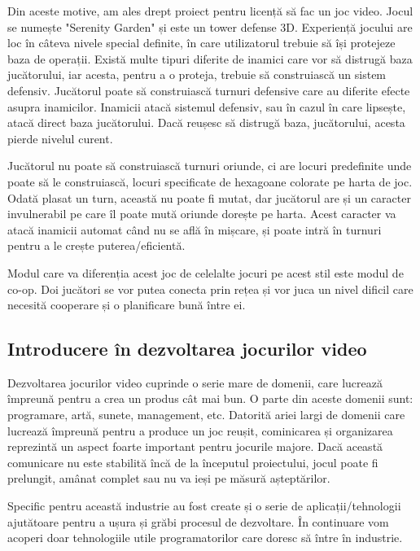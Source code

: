 \documentclass[12pt, a4paper]{article}
\begin{document}
	Din aceste motive, am ales drept proiect pentru licență să fac un joc video. Jocul se numește "Serenity Garden" și este un tower defense 3D. Experiență jocului are loc în câteva nivele special definite, în care utilizatorul trebuie să își protejeze baza de operații. Există multe tipuri diferite de inamici care vor să distrugă baza jucătorului, iar acesta, pentru a o proteja, trebuie să construiască un sistem defensiv. Jucătorul poate să construiască turnuri defensive care au diferite efecte asupra inamicilor. Inamicii atacă sistemul defensiv, sau în cazul în care lipsește, atacă direct baza jucătorului. Dacă reușesc să distrugă baza, jucătorului, acesta pierde nivelul curent.
	\newline
	
	Jucătorul nu poate să construiască turnuri oriunde, ci are locuri predefinite unde poate să le construiască, locuri specificate de hexagoane colorate pe harta de joc. Odată plasat un turn, această nu poate fi mutat, dar jucătorul are și un caracter invulnerabil pe care îl poate mută oriunde dorește pe harta. Acest caracter va atacă inamicii automat când nu se află în mișcare, și poate intră în turnuri pentru a le crește puterea/eficientă.
	\newline
	
	Modul care va diferenția acest joc de celelalte jocuri pe acest stil este modul de co-op. Doi jucători se vor putea conecta prin rețea și vor juca un nivel dificil care necesită cooperare și o planificare bună între ei.
	
	
	
	
	
	\subsection{Introducere în dezvoltarea jocurilor video}
	
	Dezvoltarea jocurilor video cuprinde o serie mare de domenii, care lucrează împreună pentru a crea un produs cât mai bun. O parte din aceste domenii sunt: programare, artă, sunete, management, etc. Datorită ariei largi de domenii care lucrează împreună pentru a produce un joc reușit, cominicarea și organizarea reprezintă un aspect foarte important pentru jocurile majore. Dacă această comunicare nu este stabilită încă de la începutul proiectului, jocul poate fi prelungit, amânat complet sau nu va ieși pe măsură așteptărilor.
	\newline
	
	Specific pentru această industrie au fost create și o serie de aplicații/tehnologii ajutătoare pentru a ușura și grăbi procesul de dezvoltare. În continuare vom acoperi doar tehnologiile utile programatorilor care doresc să între în industrie.
	\newline
	
\end{document}
